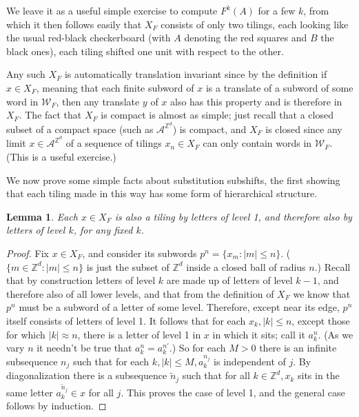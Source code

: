 \documentclass[reqno]{stml-l}
\theoremstyle{plain}
\newtheorem{lemma}[theorem]{Lemma}
\theoremstyle{definition}
\numberwithin{equation}{chapter}
\begin{document}
We leave it as a useful simple exercise to compute $F^{k}(A)$ for a few $k$, from which it then follows easily that $X_{F}$ consists of only two tilings, each looking like the usual red-black checkerboard (with $A$ denoting the red squares and $B$ the black ones), each tiling shifted one unit with respect to the other.

Any such $X_{F}$ is automatically translation invariant since by the definition if $x\in X_{F}$, meaning that each finite subword of $x$ is a translate of a subword of some word in $\mathcal{W}_{F}$, then any translate $y$ of $x$ also has this property and is therefore in $X_{F}$. The fact that $X_{F}$ is compact is almost as simple; just recall that a closed subset of a compact space (such as $\mathcal{A}^{\mathbb{Z}^{d}}$) is compact, and $X_{F}$ is closed since any limit $x\in \mathcal{A}^{\mathbb{Z}^{d}}$ of a sequence of tilings $x_{n}\in X_{F}$ can only contain words in $\mathcal{W}_{F}$. (This is a useful exercise.)

We now prove some simple facts about substitution subshifts, the first showing that each tiling made in this way has some form of hierarchical structure.

\begin{lemma}\label{ch01:lem1.4}
Each $x\in X_{F}$ is also a tiling by letters of level 1, and therefore also by letters of level $k$, for any fixed $k$.
\end{lemma}

\begin{proof}
Fix $x\in X_{F}$, and consider its subwords
$p^{n}=\{x_{m}:|m|\leq n\}$. ($\{m\in
\mathbb{Z}^{d}:|m|\leq n\}$ is just the subset of
$\mathbb{Z}^{d}$ inside a closed ball of radius $n$.)
Recall that by construction letters of level $k$ are made
up of letters of level $k-1$, and therefore also of all
lower levels, and that from the definition of $X_{F}$ we
know that $p^{n}$ must be a subword of a letter of some
level. Therefore, except near its edge, $p^{n}$ itself
consists of letters of level 1. It follows that for each
$x_{k},|k|\leq n$, except those for which $|k|\approx n$,
there is a letter of level 1 in $x$ in which it sits; call
it $a_{k}^{n}$. (As we vary $n$ it needn't be true that
$a_{k}^{n}=a_{k}^{n'}$.) So for each $M>0$ there is an
infinite subsequence $n_{j}$ such that for each $k,|k|\leq
M,a_{k}^{n_{j}}$ is independent of $j$. By diagonalization
there is a subsequence $\tilde{n}_{j}$ such that for all
$k\in \mathbb{Z}^{d},x_{k}$ sits in the same letter
$a_{k}^{\tilde{n}_{j}}\in x$ for all $j$. This proves the
case of level 1, and the general case follows by induction.
\end{proof}
\end{document}
